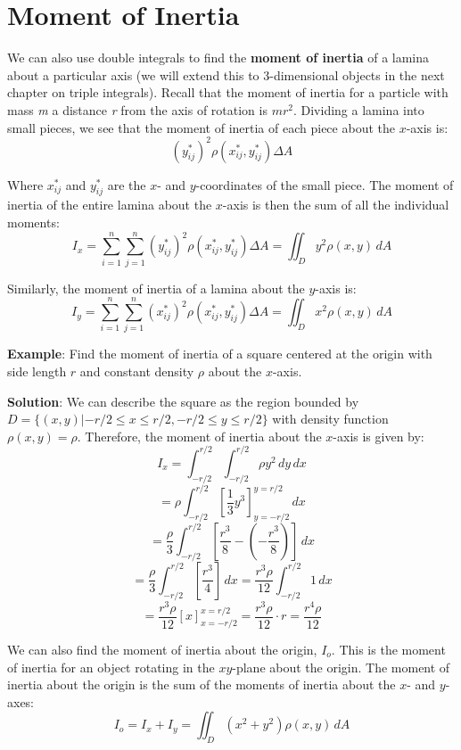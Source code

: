 \section{Moment of Inertia}
We can also use double integrals to find the \textbf{moment of inertia} of a lamina about a particular axis (we will extend this to 
3-dimensional objects in the next chapter on triple integrals). Recall that the
moment of inertia for a particle with mass \textit{m} a distance \textit{r} 
from the axis of rotation is $mr^2$. Dividing a lamina into small pieces, we 
see that the moment of inertia of each piece about the $x$-axis is:
$$\left( y_{ij}^* \right)^2 \rho \left( x_{ij}^* , y_{ij}^* \right) \Delta A$$

Where $x_{ij}^*$ and $y_{ij}^*$ are the $x$- and $y$-coordinates of the small 
piece. The moment of inertia of the entire lamina about the $x$-axis is then 
the sum of all the individual moments:
$$I_x = \sum_{i = 1}^n \sum_{j = 1}^n \left( y_{ij}^* \right)^2 \rho \left( x_{
ij}^* , y_{ij}^* \right) \Delta A = \iint_{\textit{D}} y^2 \rho \left(x, y 
\right) \,dA$$

Similarly, the moment of inertia of a lamina about the $y$-axis is:
$$I_y = \sum_{i = 1}^n \sum_{j = 1}^n \left( x_{ij}^* \right)^2 \rho \left( x_{
ij}^* , y_{ij}^* \right) \Delta A = \iint_{\textit{D}} x^2 \rho \left(x, y 
\right) \,dA$$

\textbf{Example}: Find the moment of inertia of a square centered at the origin
with side length $r$ and constant density $\rho$ about the $x$-axis.

\textbf{Solution}: We can describe the square as the region bounded by $
\textit{D} = \{(x, y)| -r/2 \leq x \leq r/2, -r/2 \leq y \leq r/2 \}$ with 
density function $\rho(x, y) = \rho$. Therefore, the moment of inertia about 
the $x$-axis is given by:
$$I_x = \int_{-r/2}^{r/2} \int_{-r/2}^{r/2} \rho y^2 \,dy\,dx$$
$$= \rho \int_{-r/2}^{r/2} \left[ \frac{1}{3} y^3 \right]_{y = -r/2}^{y = r/2} 
\,dx$$
$$= \frac{\rho}{3} \int_{-r/2}^{r/2} \left[ \frac{r^3}{8} - \left( -\frac{r^3}{
8} \right) \right]\,dx$$
$$= \frac{\rho}{3} \int_{-r/2}^{r/2} \left[ \frac{r^3}{4} \right]\,dx = \frac{
r^3 \rho}{12} \int_{-r/2}^{r/2} 1\,dx$$
$$= \frac{r^3 \rho}{12} \left[ x \right]_{x = -r/2}^{x = r/2} = \frac{r^3 \rho
}{12} \cdot r = \frac{r^4 \rho}{12}$$

We can also find the moment of inertia about the origin, $I_o$. This is the 
moment of inertia for an object rotating in the $xy$-plane about the origin. 
The moment of inertia about the origin is the sum of the moments of inertia 
about the $x$- and $y$-axes:
$$I_o = I_x + I_y = \iint_{\textit{D}} \left( x^2 + y^2 \right) \rho(x, y)\,
dA$$

